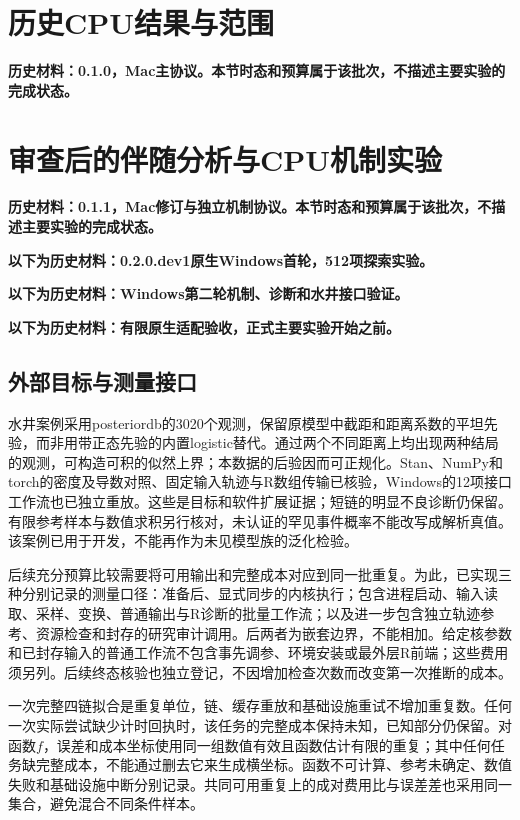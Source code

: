 \documentclass[UTF8,fontset=fandol,zihao=-4]{ctexart}
\begin{document}
\section{历史CPU结果与范围}
\noindent\textbf{历史材料：0.1.0，Mac主协议。本节时态和预算属于该批次，不描述主要实验的完成状态。}



\section{审查后的伴随分析与CPU机制实验}
\noindent\textbf{历史材料：0.1.1，Mac修订与独立机制协议。本节时态和预算属于该批次，不描述主要实验的完成状态。}



\clearpage
\noindent\textbf{以下为历史材料：0.2.0.dev1原生Windows首轮，512项探索实验。}

\clearpage
\noindent\textbf{以下为历史材料：Windows第二轮机制、诊断和水井接口验证。}

\clearpage
\noindent\textbf{以下为历史材料：有限原生适配验收，正式主要实验开始之前。}


\subsection{外部目标与测量接口}
水井案例采用posteriordb的3020个观测，保留原模型中截距和距离系数的平坦先验，而非用带正态先验的内置logistic替代。通过两个不同距离上均出现两种结局的观测，可构造可积的似然上界；本数据的后验因而可正规化。Stan、NumPy和torch的密度及导数对照、固定输入轨迹与R数组传输已核验，Windows的12项接口工作流也已独立重放。这些是目标和软件扩展证据；短链的明显不良诊断仍保留。有限参考样本与数值求积另行核对，未认证的罕见事件概率不能改写成解析真值。该案例已用于开发，不能再作为未见模型族的泛化检验。

后续充分预算比较需要将可用输出和完整成本对应到同一批重复。为此，已实现三种分别记录的测量口径：准备后、显式同步的内核执行；包含进程启动、输入读取、采样、变换、普通输出与R诊断的批量工作流；以及进一步包含独立轨迹参考、资源检查和封存的研究审计调用。后两者为嵌套边界，不能相加。给定核参数和已封存输入的普通工作流不包含事先调参、环境安装或最外层R前端；这些费用须另列。后续终态核验也独立登记，不因增加检查次数而改变第一次推断的成本。

一次完整四链拟合是重复单位，链、缓存重放和基础设施重试不增加重复数。任何一次实际尝试缺少计时回执时，该任务的完整成本保持未知，已知部分仍保留。对函数$f$，误差和成本坐标使用同一组数值有效且函数估计有限的重复；其中任何任务缺完整成本，不能通过删去它来生成横坐标。函数不可计算、参考未确定、数值失败和基础设施中断分别记录。共同可用重复上的成对费用比与误差差也采用同一集合，避免混合不同条件样本。
\end{document}
